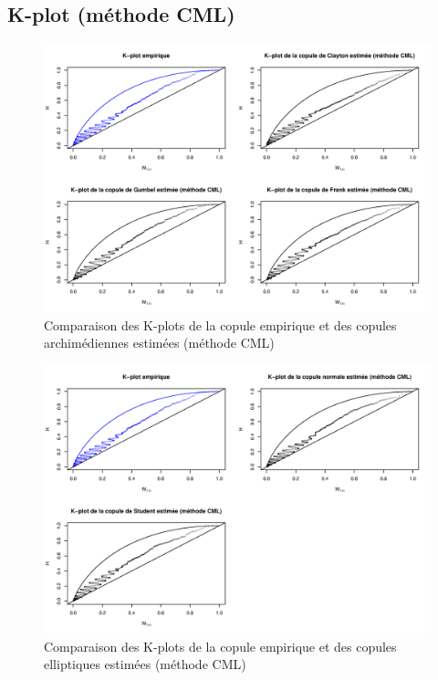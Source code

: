 \subsection{K-plot (méthode CML)}

\noindent%
\begin{figure}[H]
    \begin{center}
      \includegraphics[width=17 cm, angle=0]{./pictures/archcmlkplot.png}
      \centering\caption{\label{2}Comparaison des K-plots de la copule empirique et des copules archimédiennes estimées (méthode CML)}
    \end{center}
\end{figure}

\noindent%
\begin{figure}[H]
    \begin{center}
      \includegraphics[width=17 cm, angle=0]{./pictures/ellipcmlkplot.png}
      \centering\caption{\label{2}Comparaison des K-plots de la copule empirique et des copules elliptiques estimées (méthode CML)}
    \end{center}
\end{figure}


